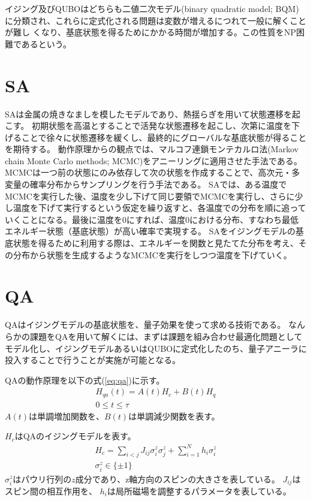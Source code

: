 \documentclass[12pt, dvipdfmx]{jmaster}
\theoremstyle{definition}
\begin{document}
イジング及びQUBOはどちらも二値二次モデル(binary quadratic model; BQM)に分類され、これらに定式化される問題は変数が増えるにつれて一般に解くことが難し
くなり、基底状態を得るためにかかる時間が増加する。この性質をNP困難であるという\cite{barahona1982computational}。
\section{SA}
SAは金属の焼きなましを模したモデルであり、熱揺らぎを用いて状態遷移を起こす。
初期状態を高温とすることで活発な状態遷移を起こし、次第に温度を下げることで徐々に状態遷移を緩くし、最終的にグローバルな基底状態が得ることを期待する。
動作原理からの観点では、マルコフ連鎖モンテカルロ法(Markov chain Monte Carlo methods; MCMC)をアニーリングに適用させた手法である。
MCMCは一つ前の状態にのみ依存して次の状態を作成することで、高次元・多変量の確率分布からサンプリングを行う手法である。
SAでは、ある温度でMCMCを実行した後、温度を少し下げて同じ要領でMCMCを実行し、さらに少し温度を下げて実行するという仮定を繰り返すと、各温度での分布を順に追っていくことになる。最後に温度を0にすれば、温度0における分布、すなわち最低エネルギー状態（基底状態）が高い確率で実現する。
SAをイジングモデルの基底状態を得るために利用する際は、エネルギーを関数と見たてた分布を考え、その分布から状態を生成するようなMCMCを実行をしつつ温度を下げていく\cite{nishimori}。

\section{QA}
QAはイジングモデルの基底状態を、量子効果を使って求める技術である。
なんらかの課題をQAを用いて解くには、まずは課題を組み合わせ最適化問題としてモデル化し、イジングモデルあるいはQUBOに定式化したのち、量子アニーラに投入することで行うことが実施が可能となる。

QAの動作原理を以下の式(\ref{eq:qa})に示す。
\begin{eqnarray}
	\label{eq:qa}
	H_{qa}(t)= A(t)H_{c} + B(t)H_{q}\\
	0 \leq t \leq \tau \nonumber
\end{eqnarray}
$A(t)$は単調増加関数を、$B(t)$は単調減少関数を表す。

$H_{c}$はQAのイジングモデルを表す。
\begin{eqnarray}
	\label{eq:qa_ising}
	H_{c} = \sum_{i<j}J_{ij}\sigma^z_i \sigma^z_j + \sum_{i=1}^{N}h_i\sigma^z_i\\
	\sigma^z_i \in\{\pm 1\}\nonumber
\end{eqnarray}
$\sigma^z_i$はパウリ行列の$z$成分であり、z軸方向のスピンの大きさを表している。
$J_{ij}$はスピン間の相互作用を、 $h_i$は局所磁場を調整するパラメータを表している。%
\end{document}
